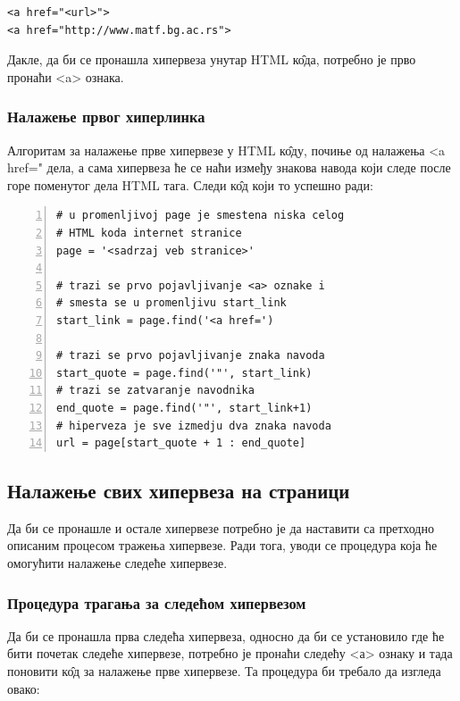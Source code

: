 \begin{lstlisting}[caption = <a> ознака, label = a_tag]
<a href="<url>">
<a href="http://www.matf.bg.ac.rs">
\end{lstlisting}

Дакле, да би се пронашла хипервеза унутар HTML к\^{о}да, потребно је прво пронаћи <a> ознака.

\subsubsection{Налажење првог хиперлинка}

Алгоритам за налажење прве хипервезе у HTML к\^{о}ду, почиње од налажења <a href=" дела, а сама хипервеза ће се наћи између знакова навода који следе после горе поменутог дела HTML тага. Следи к\^{о}д који то успешно ради:

\begin{lstlisting}[caption = Налажење првог хиперлинка, label = {lst:first_url}, numbers = left]
# u promenljivoj page je smestena niska celog
# HTML koda internet stranice
page = '<sadrzaj veb stranice>'

# trazi se prvo pojavljivanje <a> oznake i
# smesta se u promenljivu start_link
start_link = page.find('<a href=')

# trazi se prvo pojavljivanje znaka navoda
start_quote = page.find('"', start_link)
# trazi se zatvaranje navodnika
end_quote = page.find('"', start_link+1)
# hiperveza je sve izmedju dva znaka navoda
url = page[start_quote + 1 : end_quote]
\end{lstlisting}

\subsection{Налажење свих хипервеза на страници}

Да би се пронашле и остале хипервезе потребно је да наставити са претходно описаним процесом тражења хипервезе. Ради тога, уводи се процедура која ће омогућити налажење следеће хипервезе.

\subsubsection{Процедура трагања за следећом хипервезом}

Да би се пронашла прва следећа хипервеза, односно да би се установило где ће бити почетак следеће хипервезе, потребно је пронаћи следећу <а> ознаку и тада поновити к\^{о}д за налажење прве хипервезе. Та процедура би требало да изгледа овако:

